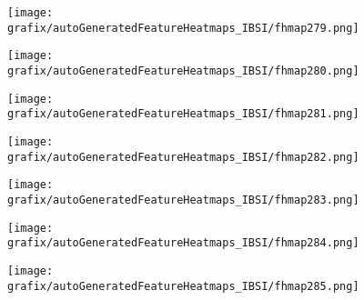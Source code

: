 \begin{subfigure}{\wid\textwidth} 
    \centering 
    \caption{\tiny \sffamily {}} 
    \vspace{\vsp} 
    \texttt{[image: grafix/autoGeneratedFeatureHeatmaps\_IBSI/fhmap279.png]} 
\end{subfigure} 
\hspace{\hsp} 
\begin{subfigure}{\wid\textwidth} 
    \centering 
    \caption{\tiny \sffamily {}} 
    \vspace{\vsp} 
    \texttt{[image: grafix/autoGeneratedFeatureHeatmaps\_IBSI/fhmap280.png]} 
\end{subfigure} 
\hspace{\hsp} 
\begin{subfigure}{\wid\textwidth} 
    \centering 
    \caption{\tiny \sffamily {}} 
    \vspace{\vsp} 
    \texttt{[image: grafix/autoGeneratedFeatureHeatmaps\_IBSI/fhmap281.png]} 
\end{subfigure} 
\hspace{\hsp} 
\begin{subfigure}{\wid\textwidth} 
    \centering 
    \caption{\tiny \sffamily {}} 
    \vspace{\vsp} 
    \texttt{[image: grafix/autoGeneratedFeatureHeatmaps\_IBSI/fhmap282.png]} 
\end{subfigure} 
\hspace{\hsp} 
\begin{subfigure}{\wid\textwidth} 
    \centering 
    \caption{\tiny \sffamily {}} 
    \vspace{\vsp} 
    \texttt{[image: grafix/autoGeneratedFeatureHeatmaps\_IBSI/fhmap283.png]} 
\end{subfigure} 
\hspace{\hsp} 
\begin{subfigure}{\wid\textwidth} 
    \centering 
    \caption{\tiny \sffamily {}} 
    \vspace{\vsp} 
    \texttt{[image: grafix/autoGeneratedFeatureHeatmaps\_IBSI/fhmap284.png]} 
\end{subfigure} 
\hspace{\hsp} 
\begin{subfigure}{\wid\textwidth} 
    \centering 
    \caption{\tiny \sffamily {}} 
    \vspace{\vsp} 
    \texttt{[image: grafix/autoGeneratedFeatureHeatmaps\_IBSI/fhmap285.png]} 
\end{subfigure} 
